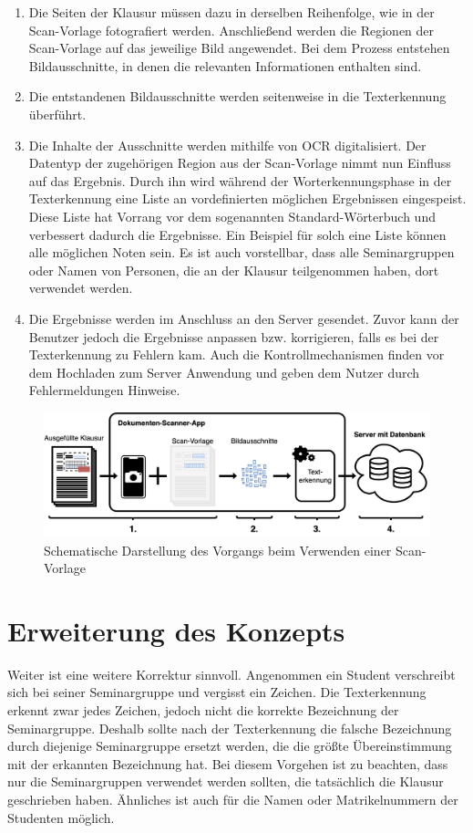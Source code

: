 \documentclass[notables, nomenclature, oneside, 150]{HSMW-Thesis}
\begin{document}
		\begin{enumerate}
			\item Die Seiten der Klausur müssen dazu in derselben Reihenfolge, wie in der Scan-Vorlage fotografiert werden. Anschließend werden die Regionen der Scan-Vorlage auf das jeweilige Bild angewendet. Bei dem Prozess entstehen Bildausschnitte, in denen die relevanten Informationen enthalten sind.
			\item Die entstandenen Bildausschnitte werden seitenweise in die Texterkennung überführt.
			\item \label{it:ocr} Die Inhalte der Ausschnitte werden mithilfe von OCR digitalisiert. Der Datentyp der zugehörigen Region aus der Scan-Vorlage nimmt nun Einfluss auf das Ergebnis. Durch ihn wird während der Worterkennungsphase in der Texterkennung eine Liste an vordefinierten möglichen Ergebnissen eingespeist. Diese Liste hat Vorrang vor dem sogenannten Standard-Wörterbuch und verbessert dadurch die Ergebnisse. Ein Beispiel für solch eine Liste können alle möglichen Noten sein. Es ist auch vorstellbar, dass alle Seminargruppen oder Namen von Personen, die an der Klausur teilgenommen haben, dort verwendet werden.
			\item Die Ergebnisse werden im Anschluss an den Server gesendet. Zuvor kann der Benutzer jedoch die Ergebnisse anpassen bzw. korrigieren, falls es bei der Texterkennung zu Fehlern kam. Auch die Kontrollmechanismen finden vor dem Hochladen zum Server Anwendung und geben dem Nutzer durch Fehlermeldungen Hinweise. \label{it:senden}
		\end{enumerate}

		
		\begin{figure}[th]
    		\centering
    		\includegraphics[width=\textwidth]{img/schema2}
    		\caption{Schematische Darstellung des Vorgangs beim Verwenden einer Scan-Vorlage}
    		\label{fig:schema2}
    	\end{figure}
		
	\section{Erweiterung des Konzepts}\label{sc:erweiterungkonzept}
		Weiter ist eine weitere Korrektur sinnvoll. Angenommen ein Student verschreibt sich bei seiner Seminargruppe und vergisst ein Zeichen. Die Texterkennung erkennt zwar jedes Zeichen, jedoch nicht die korrekte Bezeichnung der Seminargruppe. Deshalb sollte nach der Texterkennung die falsche Bezeichnung durch diejenige Seminargruppe ersetzt werden, die die größte Übereinstimmung mit der erkannten Bezeichnung hat. Bei diesem Vorgehen ist zu beachten, dass nur die Seminargruppen verwendet werden sollten, die tatsächlich die Klausur geschrieben haben. Ähnliches ist auch für die Namen oder Matrikelnummern der Studenten möglich.
		
\end{document}
